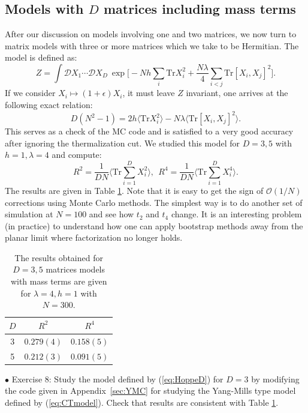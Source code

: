 \documentclass[letter,11pt]{article}
\begin{document}
\subsection{\label{subsec:ext_Hoppe}Models with $D$ matrices including mass terms}
After our discussion on models involving one and two matrices, we now turn to matrix models 
with three or more matrices which we take to be Hermitian. The model is defined as:
\begin{equation}
\label{eq:HoppeD} 
	Z = \int \mathcal{D}X_1 \cdots \mathcal{D}X_D ~
	\exp\Big[ -Nh\sum_{i}\mbox{Tr}X_{i}^{2} + \frac{N\lambda}{4} \sum_{i < j} \mbox{Tr} [X_i,X_j]^{2}\Big]. 
\end{equation}
If we consider $X_i \mapsto (1+\epsilon) X_i$, it must leave $Z$ invariant, one arrives at the following exact relation: 
\begin{equation}
	D(N^2 -1) = 2 h \langle \mbox{Tr}X_{i}^{2} \rangle 
	- N \lambda \langle \mbox{Tr}[X_i,X_j]^{2} \rangle. 
\end{equation}
This serves as a check of the MC code and is satisfied to a very good accuracy
after ignoring the thermalization cut. We studied this model for $D=3,5$ with 
$h=1, \lambda=4$ and compute: 
\begin{equation}
\label{eq:R2R4} 
	R^2  =   \frac{1}{DN} \Bigg \langle \mbox{Tr} \sum_{i=1}^{D} X_{i}^2 \bigg \rangle, 
	~~ R^4  =   \frac{1}{DN} \Bigg \langle \mbox{Tr} \sum_{i=1}^{D} X_{i}^4 \bigg \rangle.  
\end{equation}
The results are given in Table \ref{table:D_YMM_data}. Note that it is easy to get the sign of $\mathcal{O}(1/N)$ corrections using Monte Carlo methods. The simplest way is to do another set of simulation at $N = 100$ and see how $t_{2}$ and 
$t_{4}$ change. It is an interesting problem (in practice) 
to understand how one can apply bootstrap methods away from the planar limit where factorization no longer holds.

\begin{table}[h!]
	\centering
	\begin{tabular}{||c c c||} 
		\hline
		$D$ & $ R^2$ & $R^4$ \\ [0.5ex] 
		\hline\hline
		3 & $ 0.279(4) $ & $ 0.158(5) $  \\ 
		5 & $ 0.212(3) $ & $ 0.091(5) $
		 \\ [1ex] 
		\hline 
	\end{tabular}
\caption{The results obtained for $D = 3,5$ matrices models with mass terms are given for $\lambda=4, h=1$ with $N=300$.}
\label{table:D_YMM_data}
\end{table}
\begin{mdframed}[backgroundcolor=blue!3] 
	$\bullet$ Exercise 8: Study the model defined by (\ref{eq:HoppeD}) for $D=3$ by modifying the code given in Appendix~\ref{sec:YMC} for studying the Yang-Mills type model defined by (\ref{eq:CTmodel}). Check that results are consistent with Table \ref{table:D_YMM_data}.  
\end{mdframed}
\end{document}
